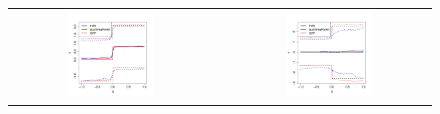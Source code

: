 \documentclass[aos]{imsart}
\theoremstyle{plain}
\theoremstyle{definition}
\theoremstyle{remark}
\newcommand{\FIGW}{0.45}
\begin{document}
\begin{CJK}{UTF8}{gbsn}
\begin{figure}
\centering
\begin{tabular}{ccc}
\includegraphics[width=\FIGW\textwidth]{quantile_plot_shift_n2k_p40.pdf} & &
\includegraphics[width=\FIGW\textwidth]{quantile_plot_spread_n2k_p40.pdf} \\

\end{tabular}
\end{figure}
\end{CJK}
\end{document}
